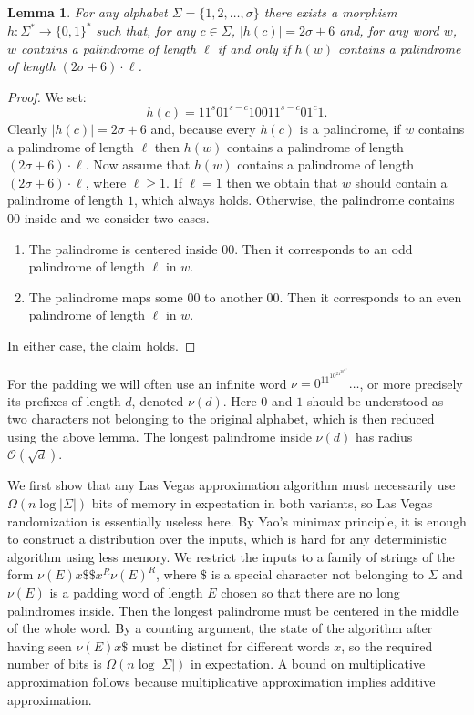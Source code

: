 \documentclass{article}[11pt,letter]
\newtheorem{lemma}[definition]{Lemma}
\newcommand{\bigo}{\mathcal{O}}
\newcommand{\aerr}{\ensuremath{E}}
\begin{document}
\begin{lemma}
\label{alphabetreduction}
For any alphabet $\Sigma=\{1,2,\ldots,\sigma\}$ there exists a morphism $h : \Sigma^* \rightarrow \{0,1\}^*$ such that, for any $c\in\Sigma$, $|h(c)| = 2\sigma+6$ and, for any word $w$, $w$ contains a palindrome
of length $\ell$ if and only if $h(w)$ contains a palindrome of length $(2\sigma+6)\cdot \ell$.
\end{lemma}

\begin{proof}
We set:
\[h(c) = 1 1^s 0 1^{s-c} 1 00 1 1^{s-c} 0 1^c 1.\]
Clearly $|h(c)|=2\sigma+6$ and, because every $h(c)$ is a palindrome, if $w$ contains a palindrome
of length $\ell$ then $h(w)$ contains a palindrome of length $(2\sigma+6)\cdot\ell$. Now assume that
$h(w)$ contains a palindrome of length $(2\sigma+6)\cdot\ell$, where $\ell \geq 1$. 
If $\ell=1$ then we obtain that $w$ should contain a palindrome of length $1$, which always holds.
Otherwise, the palindrome contains $00$ inside and we consider two cases.
\begin{enumerate}
\item The palindrome is centered inside $00$. Then it corresponds to an odd palindrome of length
$\ell$ in $w$.
\item The palindrome maps some $00$ to another $00$. Then it corresponds to an even palindrome
of length $\ell$ in $w$.
\end{enumerate}
In either case, the claim holds.
\end{proof}

For the padding we will often use an infinite word $\nu = 0^11^10^21^20^31^3\ldots$, or more precisely
its prefixes of length $d$, denoted $\nu(d)$. Here $0$ and $1$ should be understood as two characters
not belonging to the original alphabet, which is then reduced using the above lemma. The longest
palindrome inside $\nu(d)$ has radius $\bigo(\sqrt{d})$. 


We first show that any Las Vegas approximation algorithm must necessarily use
$\Omega(n\log|\Sigma|)$ bits of memory in expectation in both variants, so Las Vegas
randomization is essentially useless here.
By Yao's minimax principle, it is enough to construct a distribution over the inputs, which is hard for
any deterministic algorithm using less memory. We restrict the inputs to a family of strings
of the form $\nu(\aerr) x \$\$ x^R \nu(\aerr)^R$, where $\$$ is a special character not belonging to
$\Sigma$ and $\nu(\aerr)$ is a padding word of length $\aerr$ chosen so that there are no long palindromes
inside. Then the longest palindrome must be centered in the middle of the whole word.
By a counting argument, the state of the algorithm after
having seen $\nu(\aerr) x \$$ must be distinct for different words $x$, so the required number
of bits is $\Omega(n\log |\Sigma|)$ in expectation.
A bound on multiplicative approximation follows because multiplicative approximation implies
additive approximation.
\end{document}
